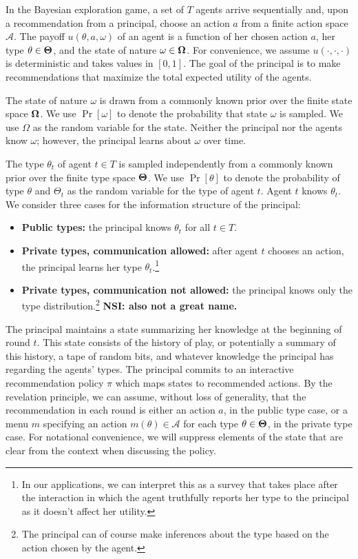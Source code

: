 \documentclass[11pt]{article}
\def\A{\mathcal{A}}
\def\varTheta{\bold{\Theta}}
\def\varOmega{\bold{\Omega}}
\begin{document}
In the Bayesian exploration game, a set of $T$ agents arrive sequentially and, upon a recommendation from a principal, choose an action $a$ from a finite action space $\A$.  The payoff $u(\theta,a,\omega)$ of an agent is a function of her chosen action $a$, her type $\theta\in\varTheta$, and the state of nature $\omega\in\varOmega$.  For convenience, we assume $u(\cdot,\cdot,\cdot)$ is deterministic and takes values in $[0,1]$.  The goal of the principal is to make recommendations that maximize the total expected utility of the agents.

The state of nature $\omega$ is drawn from a commonly known prior over the finite state space $\varOmega$. We use $\Pr[\omega]$ to denote the probability that state $\omega$ is sampled. We use $\Omega$ as the random variable for the state.  Neither the principal nor the agents know $\omega$; however, the principal learns about $\omega$ over time.

The type $\theta_t$ of agent $t\in T$ is sampled independently from a commonly known prior over the finite type space $\varTheta$. We use $\Pr[\theta]$ to denote the probability of type $\theta$ and $\Theta_t$ as the random variable for the type of agent $t$.  Agent $t$ knows $\theta_t$.  We consider three cases for the information structure of the principal:
\begin{itemize}
	\item \textbf{Public types:} the principal knows $\theta_t$ for all $t\in T$.
	\item \textbf{Private types, communication allowed:} after agent $t$ chooses an action, the principal learns her type $\theta_t$.\footnote{In our applications, we can interpret this as a survey that takes place after the interaction in which the agent truthfully reports her type to the principal as it doesn't affect her utility.} 
	\item \textbf{Private types, communication not allowed:} the principal knows only the type distribution.\footnote{The principal can of course make inferences about the type based on the action chosen by the agent.} {\bf NSI: also not a great name.}
\end{itemize}

The principal maintains a state summarizing her knowledge at the beginning of round $t$.  This state consists of the history of play, or potentially a summary of this history, a tape of random bits, and whatever knowledge the principal has regarding the agents' types.  The principal commits to an interactive recommendation policy $\pi$ which maps states to recommended actions. By the revelation principle, we can assume, without loss of generality, that the recommendation in each round is either an action $a$, in the public type case, or a menu $m$ specifying an action $m(\theta)\in\A$ for each type $\theta\in\varTheta$, in the private type case. For notational convenience, we will suppress elements of the state that are clear from the context when discussing the policy.
\end{document}
